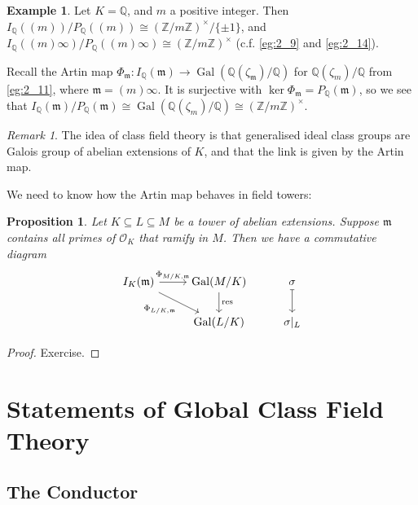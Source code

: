 \documentclass[11pt]{article}
\theoremstyle{definition}
\newtheorem{example}[definition]{Example}
\theoremstyle{plain}
\newtheorem{proposition}[definition]{Proposition}
\theoremstyle{remark}
\newtheorem{remark}[definition]{Remark}
\DeclareMathOperator{\Gal}{Gal}
\DeclareMathOperator{\res}{res}
\newcommand{\ZZ}{\mathbb{Z}}
\newcommand{\QQ}{\mathbb{Q}}
\newcommand{\cO}{\mathcal{O}}
\newcommand{\fm}{\mathfrak{m}}
\begin{document}
\begin{example}\label{eg:2_24}
    Let $K = \QQ$, and $m$ a positive integer. Then $I_\QQ((m))/P_\QQ((m)) \cong (\ZZ/m\ZZ)^\times / \{\pm 1\}$, and $I_\QQ((m)\infty)/P_\QQ((m)\infty) \cong (\ZZ/m\ZZ)^\times$ (c.f. \autoref{eg:2_9} and \autoref{eg:2_14}).

    Recall the Artin map $\Phi_\fm : I_\QQ(\fm) \to \Gal(\QQ(\zeta_\fm) / \QQ)$ for $\QQ(\zeta_m)/\QQ$ from \autoref{eg:2_11}, where $\fm = (m) \infty$. It is surjective with $\ker \Phi_\fm = P_\QQ(\fm)$, so we see that $I_\QQ(\fm)/P_\QQ(\fm) \cong \Gal(\QQ(\zeta_m)/\QQ) \cong (\ZZ/m\ZZ)^\times$.
\end{example}

\begin{remark}\label{rem:2_25}
    The idea of class field theory is that generalised ideal class groups are Galois group of abelian extensions of $K$, and that the link is given by the Artin map.
\end{remark}

\noindent We need to know how the Artin map behaves in field towers:

\begin{proposition}\label{prop:2_26}
    Let $K \subseteq L \subseteq M$ be a tower of abelian extensions. Suppose $\fm$ contains all primes of $\cO_K$ that ramify in $M$. Then we have a commutative diagram
    \begin{equation*}
    \begin{tikzcd}
        I_K(\fm) \arrow[r, "\Phi_{M/K,\fm}"] \arrow[rd, "\Phi_{L/K,\fm}"'] & \Gal(M/K) \arrow[d, "\res"] & \sigma \arrow[d, mapsto]\\
                                                                           & \Gal(L/K) & \sigma \vert_L
    \end{tikzcd}
    \end{equation*}
\end{proposition}
\begin{proof}
    Exercise.
\end{proof}

\section{Statements of Global Class Field Theory}

\subsection{The Conductor}
\end{document}
